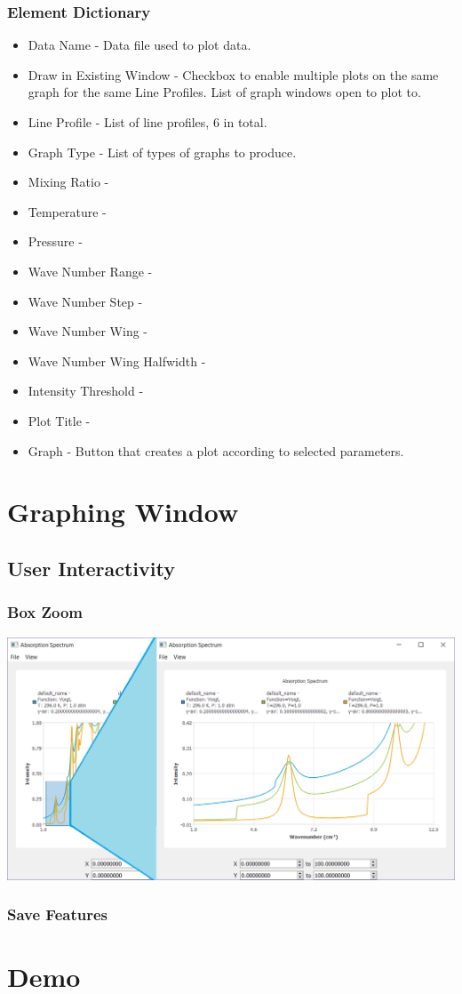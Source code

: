\documentclass[12pt]{article}
\begin{document}
\subsubsection{Element Dictionary}
\begin{itemize}
\item Data Name - Data file used to plot data.
\item Draw in Existing Window - Checkbox to enable multiple plots on the same graph for the same Line Profiles. List of graph windows open to plot to.
\item Line Profile - List of line profiles, 6 in total.
\item Graph Type - List of types of graphs to produce.
\item Mixing Ratio -
\item Temperature -
\item Pressure -
\item Wave Number Range -
\item Wave Number Step -
\item Wave Number Wing -
\item Wave Number Wing Halfwidth -
\item Intensity Threshold -
\item Plot Title -
\item Graph - Button that creates a plot according to selected parameters.
\end{itemize}

\section{Graphing Window}
\subsection{User Interactivity}
\subsubsection{Box Zoom}
\includegraphics[scale = 0.5]{GraphDemo}
\subsubsection{Save Features}

\section{Demo}
\end{document}

